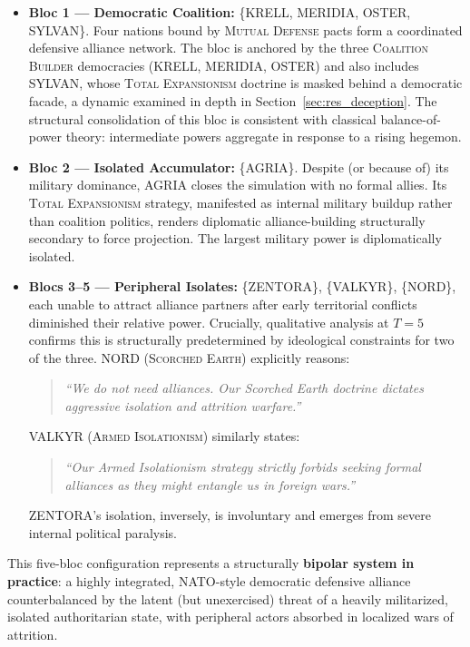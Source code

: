 \begin{itemize}
    \item \textbf{Bloc 1 — Democratic Coalition:} \{KRELL, MERIDIA, OSTER, SYLVAN\}. Four nations bound by \textsc{Mutual Defense} pacts form a coordinated defensive alliance network. The bloc is anchored by the three \textsc{Coalition Builder} democracies (KRELL, MERIDIA, OSTER) and also includes SYLVAN, whose \textsc{Total Expansionism} doctrine is masked behind a democratic facade, a dynamic examined in depth in Section~\ref{sec:res_deception}. The structural consolidation of this bloc is consistent with classical balance-of-power theory: intermediate powers aggregate in response to a rising hegemon.
    \item \textbf{Bloc 2 — Isolated Accumulator:} \{AGRIA\}. Despite (or because of) its military dominance, AGRIA closes the simulation with no formal allies. Its \textsc{Total Expansionism} strategy, manifested as internal military buildup rather than coalition politics, renders diplomatic alliance-building structurally secondary to force projection. The largest military power is diplomatically isolated.
    \item \textbf{Blocs 3--5 — Peripheral Isolates:} \{ZENTORA\}, \{VALKYR\}, \{NORD\}, each unable to attract alliance partners after early territorial conflicts diminished their relative power. Crucially, qualitative analysis at $T=5$ confirms this is structurally predetermined by ideological constraints for two of the three. NORD (\textsc{Scorched Earth}) explicitly reasons:
    \begin{quote}
        \textit{``We do not need alliances. Our Scorched Earth doctrine dictates aggressive isolation and attrition warfare.''}
    \end{quote}
    VALKYR (\textsc{Armed Isolationism}) similarly states:
    \begin{quote}
        \textit{``Our Armed Isolationism strategy strictly forbids seeking formal alliances as they might entangle us in foreign wars.''}
    \end{quote}
    ZENTORA's isolation, inversely, is involuntary and emerges from severe internal political paralysis.
\end{itemize}

This five-bloc configuration represents a structurally \textbf{bipolar system in practice}: a highly integrated, NATO-style democratic defensive alliance counterbalanced by the latent (but unexercised) threat of a heavily militarized, isolated authoritarian state, with peripheral actors absorbed in localized wars of attrition.

